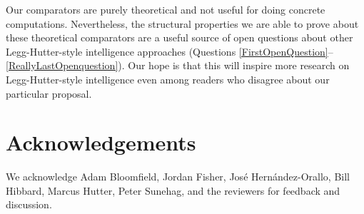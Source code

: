 \documentclass[twoside,11pt]{article}
\begin{document}
Our comparators are purely theoretical and not useful
for doing concrete computations. Nevertheless, the structural
properties we are able to prove about these theoretical comparators
are a useful source of open questions about other Legg-Hutter-style
intelligence approaches (Questions \ref{FirstOpenQuestion}--\ref{ReallyLastOpenquestion}).
Our hope is that this will inspire more research on Legg-Hutter-style intelligence
even among readers who disagree about our particular proposal.

\section*{Acknowledgements}


We acknowledge Adam Bloomfield, Jordan Fisher,
Jos{\'e} Hern{\'a}ndez-Orallo,
Bill Hibbard, Marcus Hutter, Peter Sunehag, and the reviewers
for feedback and discussion.



\end{document}
